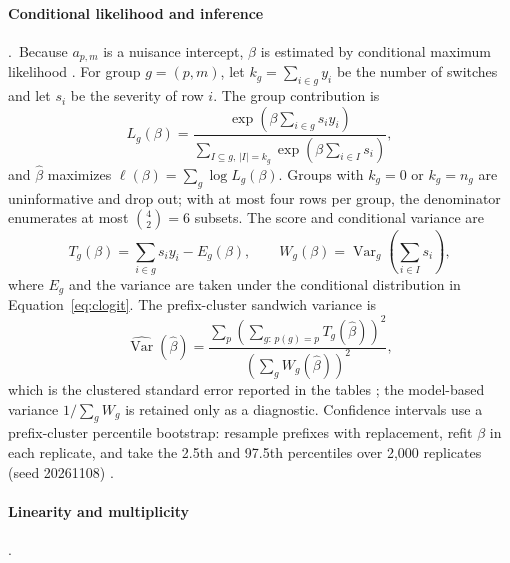 \documentclass[a4paper,fleqn]{cas-sc}
\begin{document}
\paragraph{Conditional likelihood and inference}.\
Because $a_{p,m}$ is a nuisance intercept, $\beta$ is estimated by conditional maximum
likelihood \cite{chamberlain1980}. For group $g=(p,m)$, let $k_g=\sum_{i\in g}y_i$ be the number of switches and let
$s_i$ be the severity of row $i$. The group contribution is
\begin{equation}
  L_g(\beta)=
  \frac{\exp\!\left(\beta\sum_{i\in g}s_i y_i\right)}
       {\sum_{I\subseteq g,\,|I|=k_g}\exp\!\left(\beta\sum_{i\in I}s_i\right)},
  \label{eq:clogit}
\end{equation}
and $\hat\beta$ maximizes $\ell(\beta)=\sum_g\log L_g(\beta)$. Groups with $k_g=0$ or
$k_g=n_g$ are uninformative and drop out; with at most four rows per group, the denominator
enumerates at most $\binom{4}{2}=6$ subsets. The score and conditional variance are
\begin{equation}
  T_g(\beta)=\sum_{i\in g}s_i y_i-E_g(\beta),
  \qquad
  W_g(\beta)=\operatorname{Var}_g\!\left(\sum_{i\in I}s_i\right),
  \label{eq:score}
\end{equation}
where $E_g$ and the variance are taken under the conditional distribution in
Equation~\ref{eq:clogit}. The prefix-cluster sandwich variance is
\begin{equation}
  \widehat{\operatorname{Var}}(\hat\beta)=
  \frac{\sum_{p}\left(\sum_{g:\,p(g)=p}T_g(\hat\beta)\right)^2}
       {\left(\sum_{g}W_g(\hat\beta)\right)^2},
  \label{eq:sandwich}
\end{equation}
which is the clustered standard error reported in the tables \cite{cameron2015}; the model-based
variance $1/\sum_g W_g$ is retained only as a diagnostic. Confidence intervals use a prefix-cluster
percentile bootstrap: resample prefixes with replacement, refit $\beta$ in each replicate, and
take the 2.5th and 97.5th percentiles over 2{,}000 replicates (seed 20261108) \cite{efron1979}.

\paragraph{Linearity and multiplicity}.\
\end{document}
